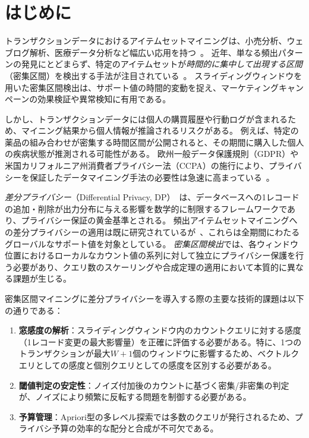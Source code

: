 \section{はじめに}\label{sec:introduction}

トランザクションデータにおけるアイテムセットマイニングは、小売分析、ウェブログ解析、医療データ分析など幅広い応用を持つ~\cite{agrawal1994fast,han2004mining}。
近年、単なる頻出パターンの発見にとどまらず、特定のアイテムセットが\emph{時間的に集中して出現する区間}（密集区間）を検出する手法が注目されている~\cite{suzuki2024dense}。
スライディングウィンドウを用いた密集区間検出は、サポート値の時間的変動を捉え、マーケティングキャンペーンの効果検証や異常検知に有用である。

しかし、トランザクションデータには個人の購買履歴や行動ログが含まれるため、マイニング結果から個人情報が推論されるリスクがある。
例えば、特定の薬品の組み合わせが密集する時間区間が公開されると、その期間に購入した個人の疾病状態が推測される可能性がある。
欧州一般データ保護規則（GDPR）や米国カリフォルニア州消費者プライバシー法（CCPA）の施行により、プライバシーを保証したデータマイニング手法の必要性は急速に高まっている~\cite{lee2011how}。

\emph{差分プライバシー}（Differential Privacy, DP）~\cite{dwork2006calibrating,dwork2014algorithmic}は、データベースへの1レコードの追加・削除が出力分布に与える影響を数学的に制限するフレームワークであり、プライバシー保証の黄金基準とされる。
頻出アイテムセットマイニングへの差分プライバシーの適用は既に研究されているが~\cite{zeng2012differentially,li2012privbasis,bhaskar2010discovering}、これらは全期間にわたるグローバルなサポート値を対象としている。
\emph{密集区間検出}では、各ウィンドウ位置におけるローカルなカウント値の系列に対して独立にプライバシー保護を行う必要があり、クエリ数のスケーリングや合成定理の適用において本質的に異なる課題が生じる。

密集区間マイニングに差分プライバシーを導入する際の主要な技術的課題は以下の通りである：
\begin{enumerate}
  \item \textbf{窓感度の解析}：スライディングウィンドウ内のカウントクエリに対する感度（1レコード変更の最大影響量）を正確に評価する必要がある。特に、1つのトランザクションが最大$W+1$個のウィンドウに影響するため、ベクトルクエリとしての感度と個別クエリとしての感度を区別する必要がある。
  \item \textbf{閾値判定の安定性}：ノイズ付加後のカウントに基づく密集/非密集の判定が、ノイズにより頻繁に反転する問題を制御する必要がある。
  \item \textbf{予算管理}：Apriori型の多レベル探索では多数のクエリが発行されるため、プライバシ予算の効率的な配分と合成が不可欠である。
\end{enumerate}


